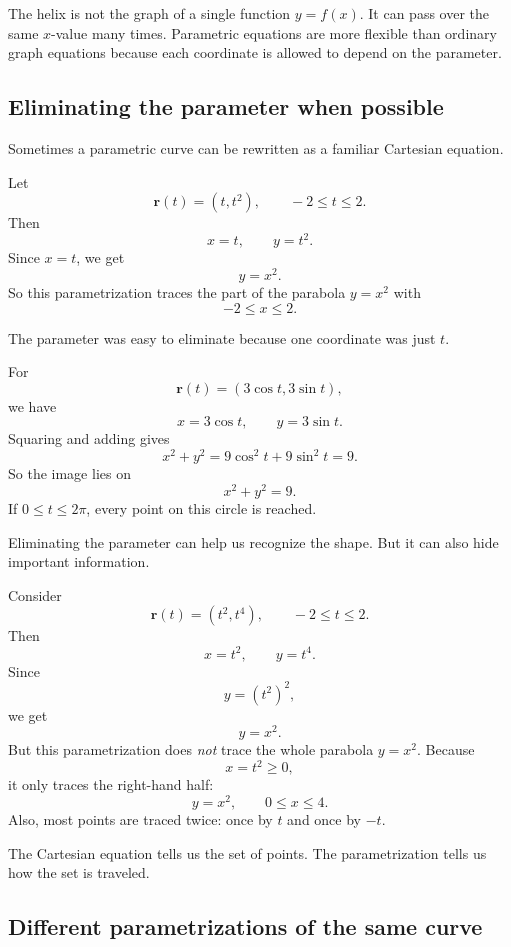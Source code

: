 The helix is not the graph of a single function \(y=f(x)\).  It can pass over the same
\(x\)-value many times.  Parametric equations are more flexible than ordinary graph
equations because each coordinate is allowed to depend on the parameter.

\subsection{Eliminating the parameter when possible}

Sometimes a parametric curve can be rewritten as a familiar Cartesian equation.

\begin{example}
Let
\[
    \mathbf r(t)=(t,t^2),\qquad -2\le t\le2.
\]
Then
\[
    x=t,\qquad y=t^2.
\]
Since \(x=t\), we get
\[
    y=x^2.
\]
So this parametrization traces the part of the parabola \(y=x^2\) with
\[
    -2\le x\le2.
\]
\end{example}

The parameter was easy to eliminate because one coordinate was just \(t\).

\begin{example}
For
\[
    \mathbf r(t)=(3\cos t,3\sin t),
\]
we have
\[
    x=3\cos t,\qquad y=3\sin t.
\]
Squaring and adding gives
\[
    x^2+y^2
    =
    9\cos^2t+9\sin^2t
    =
    9.
\]
So the image lies on
\[
    x^2+y^2=9.
\]
If \(0\le t\le2\pi\), every point on this circle is reached.
\end{example}

Eliminating the parameter can help us recognize the shape.  But it can also hide
important information.

\begin{example}
Consider
\[
    \mathbf r(t)=(t^2,t^4),\qquad -2\le t\le2.
\]
Then
\[
    x=t^2,\qquad y=t^4.
\]
Since
\[
    y=(t^2)^2,
\]
we get
\[
    y=x^2.
\]
But this parametrization does \emph{not} trace the whole parabola \(y=x^2\).  Because
\[
    x=t^2\ge0,
\]
it only traces the right-hand half:
\[
    y=x^2,\qquad 0\le x\le4.
\]
Also, most points are traced twice: once by \(t\) and once by \(-t\).
\end{example}

The Cartesian equation tells us the set of points.  The parametrization tells us how the
set is traveled.

\subsection{Different parametrizations of the same curve}

